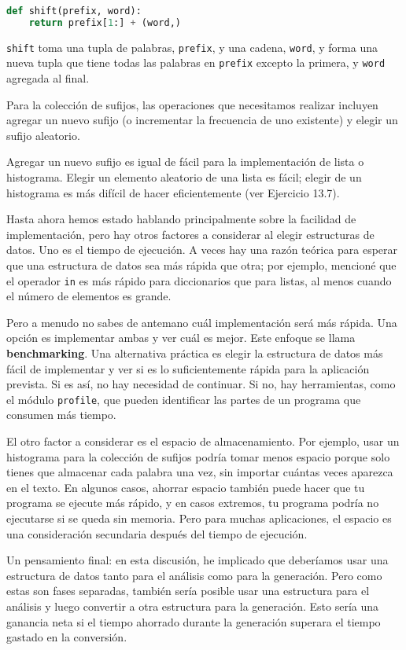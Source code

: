 \begin{lstlisting}[language=Python]
def shift(prefix, word):
    return prefix[1:] + (word,)
\end{lstlisting}

\texttt{shift} toma una tupla de palabras, \texttt{prefix}, y una cadena, \texttt{word}, y forma una nueva tupla que tiene todas las palabras en \texttt{prefix} excepto la primera, y \texttt{word} agregada al final.

Para la colección de sufijos, las operaciones que necesitamos realizar incluyen agregar un nuevo sufijo (o incrementar la frecuencia de uno existente) y elegir un sufijo aleatorio.

Agregar un nuevo sufijo es igual de fácil para la implementación de lista o histograma. Elegir un elemento aleatorio de una lista es fácil; elegir de un histograma es más difícil de hacer eficientemente (ver Ejercicio 13.7).

Hasta ahora hemos estado hablando principalmente sobre la facilidad de implementación, pero hay otros factores a considerar al elegir estructuras de datos. Uno es el tiempo de ejecución. A veces hay una razón teórica para esperar que una estructura de datos sea más rápida que otra; por ejemplo, mencioné que el operador \texttt{in} es más rápido para diccionarios que para listas, al menos cuando el número de elementos es grande.

Pero a menudo no sabes de antemano cuál implementación será más rápida. Una opción es implementar ambas y ver cuál es mejor. Este enfoque se llama \textbf{benchmarking}. Una alternativa práctica es elegir la estructura de datos más fácil de implementar y ver si es lo suficientemente rápida para la aplicación prevista. Si es así, no hay necesidad de continuar. Si no, hay herramientas, como el módulo \texttt{profile}, que pueden identificar las partes de un programa que consumen más tiempo.

El otro factor a considerar es el espacio de almacenamiento. Por ejemplo, usar un histograma para la colección de sufijos podría tomar menos espacio porque solo tienes que almacenar cada palabra una vez, sin importar cuántas veces aparezca en el texto. En algunos casos, ahorrar espacio también puede hacer que tu programa se ejecute más rápido, y en casos extremos, tu programa podría no ejecutarse si se queda sin memoria. Pero para muchas aplicaciones, el espacio es una consideración secundaria después del tiempo de ejecución.

Un pensamiento final: en esta discusión, he implicado que deberíamos usar una estructura de datos tanto para el análisis como para la generación. Pero como estas son fases separadas, también sería posible usar una estructura para el análisis y luego convertir a otra estructura para la generación. Esto sería una ganancia neta si el tiempo ahorrado durante la generación superara el tiempo gastado en la conversión.

